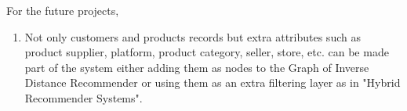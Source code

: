 For the future projects,
\begin{enumerate}
	\item Not only customers and products records but extra attributes such as product supplier, platform, product category, seller, store, etc. can be made part of the system either adding them as nodes to the Graph of Inverse Distance Recommender or using them as an extra filtering layer as in "Hybrid Recommender Systems".
\end{enumerate}